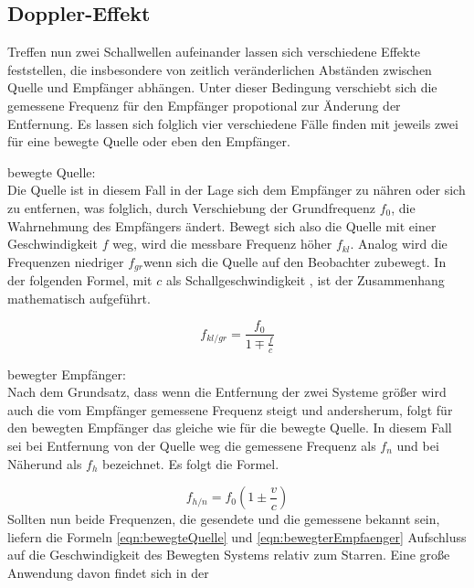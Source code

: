 \subsection{Doppler-Effekt}
Treffen nun zwei Schallwellen aufeinander lassen sich verschiedene Effekte feststellen, die insbesondere von zeitlich veränderlichen
Abständen zwischen Quelle und Empfänger abhängen. Unter dieser Bedingung verschiebt sich die gemessene Frequenz für den Empfänger 
propotional zur Änderung der Entfernung. 
Es lassen sich folglich vier verschiedene Fälle finden mit jeweils zwei für eine bewegte Quelle oder eben den Empfänger.
\begin{description}
    \item bewegte Quelle: \\
    Die Quelle ist in diesem Fall in der Lage sich dem Empfänger zu nähren oder sich zu entfernen, was folglich, durch Verschiebung der Grundfrequenz $f_0$,
    die Wahrnehmung des Empfängers ändert. Bewegt sich also die Quelle mit einer Geschwindigkeit $f$ weg, wird die messbare Frequenz höher $f_{kl}$. Analog wird die Frequenzen
    niedriger $f_{gr}$wenn sich die Quelle auf den Beobachter zubewegt. In der folgenden Formel, mit $c$ als Schallgeschwindigkeit
    \cite{...}, ist der Zusammenhang mathematisch aufgeführt.
\end{description}
\begin{equation}
    \label{eqn:bewegteQuelle}
    f_{kl/gr} = \frac{f_0}{1 \mp \frac{f}{c}}
\end{equation}
\begin{description}
    \item bewegter Empfänger: \\
    Nach dem Grundsatz, dass wenn die Entfernung der zwei Systeme größer wird auch die vom Empfänger gemessene Frequenz steigt und andersherum,
    folgt für den bewegten Empfänger das gleiche wie für die bewegte Quelle. In diesem Fall sei bei Entfernung von der Quelle weg die gemessene 
    Frequenz als $f_n$ und bei Näherund als $f_h$ bezeichnet. Es folgt die Formel.
\end{description}
\begin{equation}
    \label{eqn:bewegterEmpfaenger}
    f_{h/n} = f_0 \left ( 1 \pm \frac{v}{c} \right )
\end{equation}
Sollten nun beide Frequenzen, die gesendete und die gemessene bekannt sein, liefern die Formeln \eqref{eqn:bewegteQuelle} und \eqref{eqn:bewegterEmpfaenger}
Aufschluss auf die Geschwindigkeit des Bewegten Systems relativ zum Starren. Eine große Anwendung davon findet sich in der 
